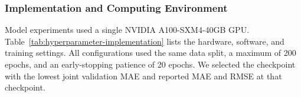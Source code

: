 \textbf{}%
\subsubsection{Implementation and Computing Environment}\label{sec:exp-implementation}

Model experiments used a single NVIDIA A100-SXM4-40GB GPU. Table~\ref{tab:hyperparameter-implementation} lists the hardware, software, and training settings. All configurations used the same data split, a maximum of 200 epochs, and an early-stopping patience of 20 epochs. We selected the checkpoint with the lowest joint validation MAE and reported MAE and RMSE at that checkpoint.


